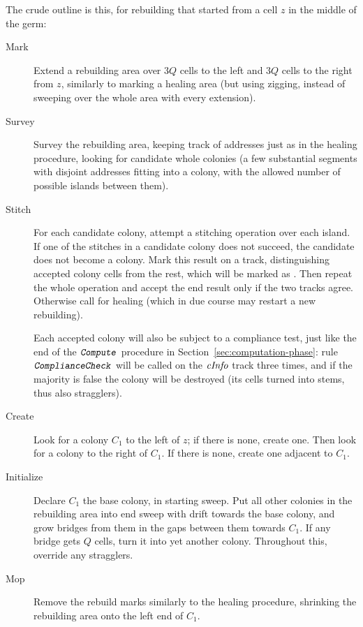 \documentclass[12pt]{memoir}
\newcommand{\fld}[1]{\ensuremath{\textit{#1\/}}}
\newcommand{\rul}[1]{\ensuremath{\texttt{\slshape #1\/}}}
\newcommand{\cInfo}{\fld{cInfo}}
\newcommand{\Comp}{\rul{Compute}}
\begin{document}
The crude outline is this, for rebuilding that started from a cell \( z \) in the middle
of the germ:
\begin{description}
 \item[Mark] Extend a rebuilding area 
   over \( 3Q \) cells to the left and \( 3Q \) cells to the right 
   from \( z \), similarly to marking a healing area
   (but using zigging, instead of sweeping over the whole area with every extension).

 \item[Survey] Survey the rebuilding area, 
   keeping track of addresses just as in the healing procedure,
   looking for candidate whole colonies (a few substantial segments with disjoint 
   addresses fitting into a colony, with the allowed number of possible islands 
   between them).

 \item[Stitch] For each candidate colony, attempt a stitching operation over each island.
 If one of the stitches in a candidate colony does not succeed,
 the candidate does not become a colony.
 Mark this result on a track, distinguishing accepted colony cells from the
 rest, which will be marked as .
 Then repeat the whole operation and accept the end result only if the two tracks agree.
 Otherwise call for healing (which in due course may restart a new rebuilding).

Each accepted colony will also be subject to a compliance test,
just like the end of the \( \Comp \) procedure in Section~\ref{sec:computation-phase}:
rule \( \rul{ComplianceCheck} \) will be called on the \( \cInfo \) track three times,
and if the majority is false the colony will be destroyed (its cells turned into stems,
thus also stragglers).

\item[Create] Look for a colony \( C_{1} \) to the left of \( z \); if there is none,
  create one.
  Then look for a colony to the right of \( C_{1} \).
  If there is none, create one adjacent to \( C_{1} \).
 
\item[Initialize] 
  Declare \( C_{1} \) the base colony, in starting sweep.
  Put all other colonies in the rebuilding area
  into end sweep with drift towards the base colony, and
  grow bridges from them in the gaps between them towards \( C_{1} \).
  If any bridge gets \( Q \) cells, turn it into yet another colony.
  Throughout this, override any stragglers.

\item[Mop] Remove the rebuild marks similarly to the healing procedure,
  shrinking the rebuilding area onto the left end of \( C_{1} \).
\end{description}
\end{document}
